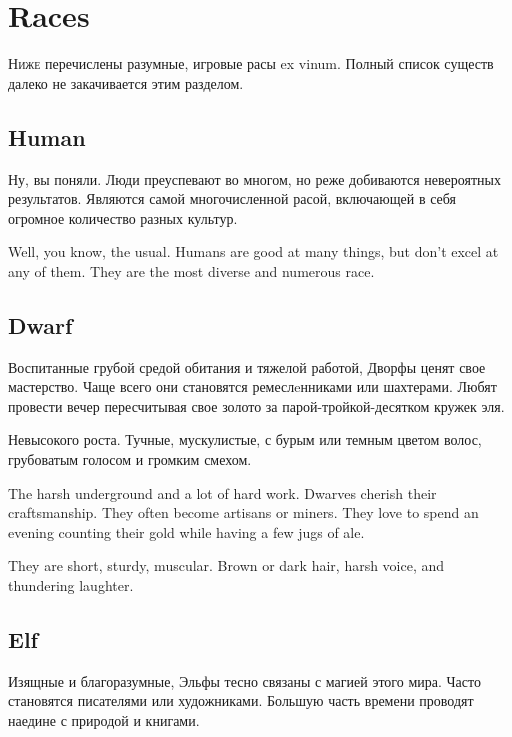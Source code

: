 \documentclass[a5paper,11pt]{book}
\begin{document}
\chapter{Races}
\begin{multicols}{2}

\begin{ru}
\lettrine{Н}{иже} перечислены разумные, игровые расы ex vinum. Полный список существ далеко не закачивается этим разделом.
\end{ru}

\section{Human}
\begin{ru}
Ну, вы поняли. Люди преуспевают во многом, но реже добиваются невероятных результатов. Являются самой многочисленной расой, включающей в себя огромное количество разных культур.
\end{ru}

\begin{en}
Well, you know, the usual. Humans are good at many things, but don't excel at any of them. They are the most diverse and numerous race.
\end{en}

\section{Dwarf}
\begin{ru}
Воспитанные грубой средой обитания и тяжелой работой, Дворфы ценят свое мастерство. Чаще всего они становятся ремеслeнниками или шахтерами. Любят провести вечер пересчитывая свое золото за парой-тройкой-десятком кружек эля.

Невысокого роста. Тучные, мускулистые, с бурым или темным цветом волос, грубоватым голосом и громким смехом.
\end{ru}

\begin{en}
The harsh underground and a lot of hard work. Dwarves cherish their craftsmanship. They often become artisans or miners. They love to spend an evening counting their gold while having a few jugs of ale.

They are short, sturdy, muscular. Brown or dark hair, harsh voice, and thundering laughter.
\end{en}

\section{Elf}
\begin{ru}
Изящные и благоразумные, Эльфы тесно связаны с магией этого мира. Часто становятся писателями или художниками. Большую часть времени проводят наедине с природой и книгами.


\end{ru}
\end{multicols}
\end{document}
